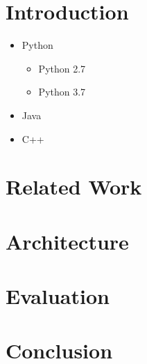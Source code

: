 \documentclass{article}
\begin{document}
\section{Introduction}
\begin{itemize}
\item Python
\begin{itemize}
\item Python 2.7
\item Python 3.7
\end{itemize}
\item Java
\item C++
\end{itemize}
\section{Related Work}
\section{Architecture}
\section{Evaluation}
\section{Conclusion}
\end{document}
